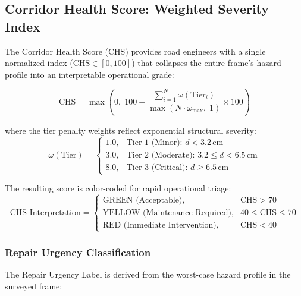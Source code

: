 \subsection{Corridor Health Score: Weighted Severity Index}

The Corridor Health Score (CHS) provides road engineers with a single normalized index ($\text{CHS} \in [0, 100]$) that collapses the entire frame's hazard profile into an interpretable operational grade:

\begin{equation}
    \text{CHS} = \max\left(0,\; 100 - \frac{\displaystyle\sum_{i=1}^{N} \omega(\text{Tier}_i)}{\max(N \cdot \omega_{\max},\; 1)} \times 100\right)
    \label{eq:chs_formula}
\end{equation}

where the tier penalty weights reflect exponential structural severity:
\begin{equation}
    \omega(\text{Tier}) = 
    \begin{cases}
        1.0, & \text{Tier 1 (Minor): } d < 3.2\,\text{cm} \\
        3.0, & \text{Tier 2 (Moderate): } 3.2 \le d < 6.5\,\text{cm} \\
        8.0, & \text{Tier 3 (Critical): } d \ge 6.5\,\text{cm}
    \end{cases}
\end{equation}

The resulting score is color-coded for rapid operational triage:
\begin{equation}
    \text{CHS Interpretation} = 
    \begin{cases}
        \text{GREEN (Acceptable)}, & \text{CHS} > 70 \\
        \text{YELLOW (Maintenance Required)}, & 40 \le \text{CHS} \le 70 \\
        \text{RED (Immediate Intervention)}, & \text{CHS} < 40
    \end{cases}
\end{equation}

\subsubsection{Repair Urgency Classification}
The Repair Urgency Label is derived from the worst-case hazard profile in the surveyed frame:

